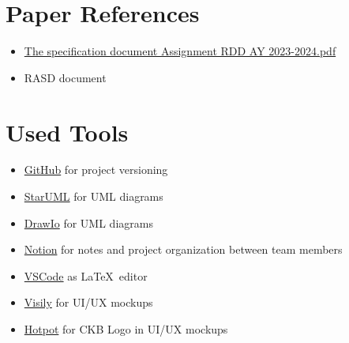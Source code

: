 \section{Paper References}
\label{sec:paper_references}%
\begin{itemize}
    \item \href{https://polimi365-my.sharepoint.com/:b:/g/personal/10710351_polimi_it/EZXUPFfeFKdBkf5M8W-EBYgB2JrrVLr23BYJ4MXQ7kzUkA?e=o0wvyw}{The specification document Assignment RDD AY 2023-2024.pdf}
    \item {RASD document}
\end{itemize}


\section{Used Tools}
\label{sec:used_tools}%
\begin{itemize}
    \item \href{https://github.com/}{GitHub} for project versioning
    \item \href{https://staruml.io/}{StarUML} for UML diagrams
    \item \href{https://draw.io/}{DrawIo} for UML diagrams
    \item \href{https://www.notion.so/}{Notion} for notes and project organization between team members
    \item \href{https://code.visualstudio.com/}{VSCode} as \LaTeX\ editor
    \item \href{https://www.visily.ai/}{Visily} for UI/UX mockups
    \item \href{https://hotpot.ai/}{Hotpot} for CKB Logo in UI/UX mockups
\end{itemize}